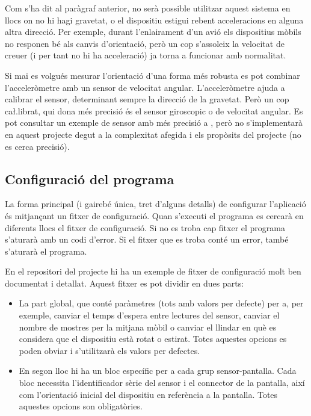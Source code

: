 Com s'ha dit al paràgraf anterior, no serà possible utilitzar aquest sistema en
llocs on no hi hagi gravetat, o el dispositiu estigui rebent acceleracions en
alguna altra direcció. Per exemple, durant l'enlairament d'un avió els
dispositius mòbils no responen bé als canvis d'orientació, però un cop
s'assoleix la velocitat de creuer (i per tant no hi ha acceleració) ja torna
a funcionar amb normalitat.

Si mai es volgués mesurar l'orientació d'una forma més robusta es pot combinar
l'acceleròmetre amb un sensor de velocitat angular. L'acceleròmetre ajuda a
calibrar el sensor, determinant sempre la direcció de la gravetat. Però un
cop ca\l.librat, qui dona més precisió és el sensor giroscopic o de velocitat
angular. Es pot consultar un exemple de sensor amb més precisió a
\cite{6702711}, però no
s'implementarà en aquest projecte degut a la complexitat afegida i els propòsits
del projecte (no es cerca precisió).

\subsection{Configuració del programa}

La forma principal (i gairebé única, tret d'alguns detalls) de configurar
l'aplicació és mitjançant un fitxer de configuració. Quan s'executi el programa
es cercarà en diferents llocs el fitxer de configuració. Si no es troba cap
fitxer el programa s'aturarà amb un codi d'error. Si el fitxer que es troba
conté un error, també s'aturarà el programa.

En el repositori del projecte hi ha un exemple de fitxer de configuració molt
ben documentat i detallat. Aquest fitxer es pot dividir en dues parts:

\begin{itemize}
    \item La part global, que conté paràmetres (tots amb valors per defecte) per
    a, per exemple, canviar el temps d'espera entre lectures del sensor, canviar
    el nombre de mostres per la mitjana mòbil o canviar el llindar en què es
    considera que el dispositiu està rotat o estirat. Totes aquestes opcions es
    poden obviar i s'utilitzarà els valors per defectes.
    \item En segon lloc hi ha un bloc específic per a cada grup sensor-pantalla.
    Cada bloc necessita l'identificador sèrie del sensor i el connector de la
    pantalla, així com l'orientació inicial del dispositiu en referència a la
    pantalla. Totes aquestes opcions son obligatòries.
\end{itemize}

